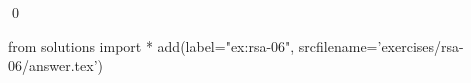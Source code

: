 
\begin{ex} 
  \label{ex:rsa-06}
  
  \qed
\end{ex} 
\begin{python0}
from solutions import *
add(label="ex:rsa-06",
    srcfilename='exercises/rsa-06/answer.tex') 
\end{python0}
